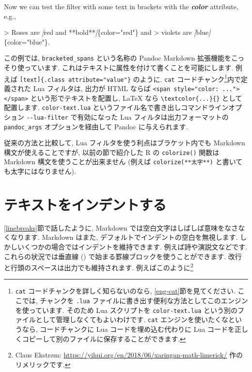 \documentclass[
  11pt,
]{bxjsreport}
\newenvironment{Shaded}{\begin{snugshade}}{\end{snugshade}}
\newcommand{\AttributeTok}[1]{\textcolor[rgb]{0.77,0.63,0.00}{#1}}
\newcommand{\CommentTok}[1]{\textcolor[rgb]{0.56,0.35,0.01}{\textit{#1}}}
\newcommand{\InformationTok}[1]{\textcolor[rgb]{0.56,0.35,0.01}{\textbf{\textit{#1}}}}
\newcommand{\NormalTok}[1]{#1}
\newcommand{\OtherTok}[1]{\textcolor[rgb]{0.56,0.35,0.01}{#1}}
\begin{document}
\begin{Shaded}
\begin{Highlighting}[]
\NormalTok{Now we can test the filter with some text in brackets with}
\NormalTok{the }\InformationTok{\textasciigrave{}color\textasciigrave{}}\NormalTok{ attribute, e.g.,}

\AttributeTok{\textgreater{} Roses are }\CommentTok{[}\OtherTok{red and **bold**}\CommentTok{]}\AttributeTok{\{color="red"\} and}
\AttributeTok{\textgreater{} violets are }\CommentTok{[}\OtherTok{blue}\CommentTok{]}\AttributeTok{\{color="blue"\}.}
\end{Highlighting}
\end{Shaded}

この例では, \texttt{bracketed\_spans} という名称の Pandoc Markdown 拡張機能をこっそり使っています. これはテキストに属性を付けて書くことを可能にします. 例えば \texttt{{[}text{]}\{.class\ attribute="value"\}} のように. \texttt{cat} コードチャンク\footnote{\texttt{cat} コードチャンクを詳しく知らないのなら, \ref{eng-cat}節を見てください. ここでは, チャンクを \texttt{.lua} ファイルに書き出す便利な方法としてこのエンジンを使っています. そのため Lua スクリプトを \texttt{color-text.lua} という別のファイルとして管理しなくてもよいわけです. \texttt{cat} エンジンを使いたくなというなら, コードチャンクに Lua コードを埋め込む代わりに Lua コードを正しくコピーして別のファイルに保存することができます.}内で定義された Lua フィルタは, 出力が HTML ならば \texttt{\textless{}span\ style="color:\ ..."\textgreater{}\textless{}/span\textgreater{}} という形でテキストを配置し, LaTeX なら \texttt{\textbackslash{}textcolor\{...\}\{\}} として配置します. \texttt{color-text.lua} というファイル名で書き出しコマンドラインオプション \texttt{-\/-lua-filter} で有効になった Lua フィルタは出力フォーマットの \texttt{pandoc\_args} オプションを経由して Pandoc に与えられます.

従来の方法と比較して, Lua フィルタを使う利点はブラケット内でも Markdown 構文が使えることですが, 以前の節で紹介した R の \texttt{colorize()} 関数は Markdown 構文を使うことが出来ません (例えば \texttt{colorize(\textquotesingle{}**太字**\textquotesingle{})} と書いても太字にはなりません).

\hypertarget{indent-text}{%
\section{テキストをインデントする}\label{indent-text}}

\ref{linebreaks}節で話したように, Markdown では空白文字はしばしば意味をなさなくなります. Markdown はまた, デフォルトでインデントの空白を無視します. しかしいくつかの場合ではインデントを維持できます. 例えば詩や演説文などです. これらの状況では垂直線 (\texttt{\textbar{}}) で始まる罫線ブロックを使うことができます. 改行と行頭のスペースは出力でも維持されます. 例えばこのように\footnote{Claus Ekstrøm: \url{https://yihui.org/en/2018/06/xaringan-math-limerick/} 作のリメリックです.}
\end{document}
